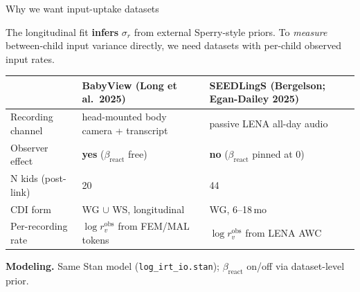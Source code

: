 \documentclass[aspectratio=169,t]{beamer}
\newcommand{\sigr}{\sigma_{r}}
\begin{document}


\begin{frame}{Why we want input-uptake datasets}

The longitudinal fit \textbf{infers} $\sigr$ from external Sperry-style
priors. To \emph{measure} between-child input variance directly, we
need datasets with per-child observed input rates.

\vspace{0.6em}
\begin{tabularx}{\linewidth}{lXX}
\toprule
& \textbf{BabyView} (Long et al.\ 2025) &
\textbf{SEEDLingS} (Bergelson; Egan-Dailey 2025) \\
\midrule
Recording channel & head-mounted body camera + transcript & passive
LENA all-day audio \\
Observer effect   & \textbf{yes} ($\beta_{\mathrm{react}}$ free) &
\textbf{no} ($\beta_{\mathrm{react}}$ pinned at 0) \\
N kids (post-link) & 20 & 44 \\
CDI form          & WG $\cup$ WS, longitudinal & WG, 6--18\,mo \\
Per-recording rate & $\log r^{\mathrm{obs}}_v$ from FEM/MAL tokens &
$\log r^{\mathrm{obs}}_v$ from LENA AWC \\
\bottomrule
\end{tabularx}

\vspace{0.4em}
\textbf{Modeling.} Same Stan model (\texttt{log\_irt\_io.stan});
$\beta_{\mathrm{react}}$ on/off via dataset-level prior.

\end{frame}
\end{document}
